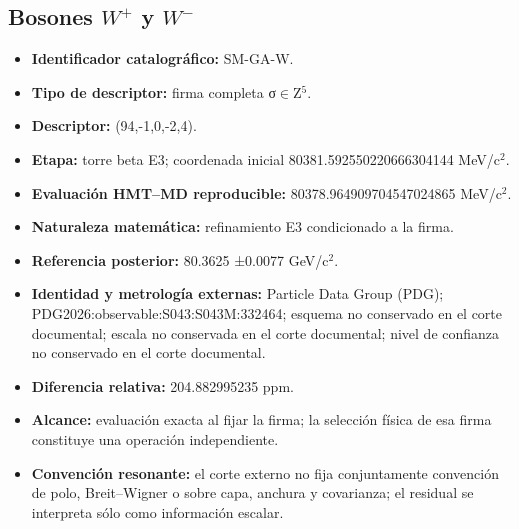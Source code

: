 \subsection{Bosones \texorpdfstring{\(W^{+}\)}{W+} y \texorpdfstring{\(W^{-}\)}{W−}}
\begin{itemize}
\item \textbf{Identificador catalográfico:} SM-GA-W.
\item \textbf{Tipo de descriptor:} firma completa σ\(\in\)Z\({}^{5}\).
\item \textbf{Descriptor:} (94,-1,0,-2,4).
\item \textbf{Etapa:} torre beta E3; coordenada inicial 80381.592550\allowbreak{}220666\allowbreak{}304144 MeV/c\({}^{2}\).
\item \textbf{Evaluación HMT--MD reproducible:} 80378.964909\allowbreak{}704547\allowbreak{}024865 MeV/c\({}^{2}\).
\item \textbf{Naturaleza matemática:} refinamiento E3 condicionado a la firma.
\item \textbf{Referencia posterior:} 80.3625 ±\allowbreak{}0.0077 GeV/c\({}^{2}\).
\item \textbf{Identidad y metrología externas:} Particle Data Group (PDG); PDG2026:\allowbreak{}observable:\allowbreak{}S043:\allowbreak{}S043M:\allowbreak{}332464; esquema no conservado en el corte documental; escala no conservada en el corte documental; nivel de confianza no conservado en el corte documental.
\item \textbf{Diferencia relativa:} 204.882995\allowbreak{}235 ppm.
\item \textbf{Alcance:} evaluación exacta al fijar la firma; la selección física de esa firma constituye una operación independiente.
\item \textbf{Convención resonante:} el corte externo no fija conjuntamente convención de polo, Breit--Wigner o sobre capa, anchura y covarianza; el residual se interpreta sólo como información escalar.
\end{itemize}
